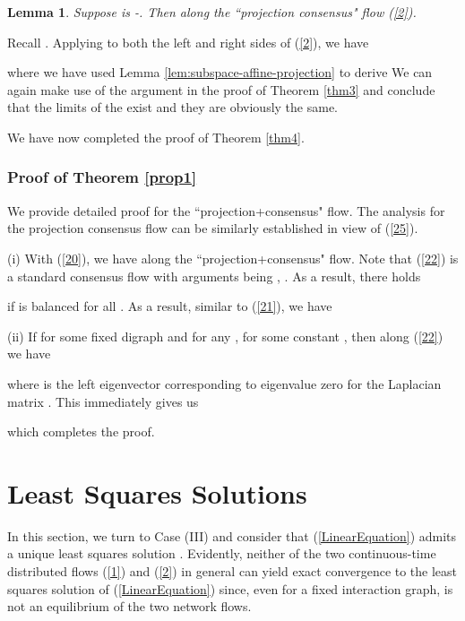 \documentclass[a4paper, 11pt]{article}
\newtheorem{lemma}{Lemma}
\begin{document}
\medskip

\begin{lemma}\label{lemma-bidirectional}
Suppose  is -. Then  along the ``projection consensus" flow (\ref{2}).
\end{lemma}

\medskip






Recall  . Applying  to both the left and right sides of (\ref{2}), we have

where we have used Lemma \ref{lem:subspace-affine-projection} to derive
 We can again make use of the argument  in the proof of Theorem \ref{thm3} and conclude that the limits of the  exist and they are obviously the same.

We have now completed the proof of Theorem \ref{thm4}.

\subsubsection{Proof of Theorem \ref{prop1}}

We provide detailed proof for the ``projection+consensus" flow.  The analysis for the projection consensus flow can be similarly established in view of  (\ref{25}).


\noindent (i) With (\ref{20}), we have 
along the ``projection+consensus" flow. Note that (\ref{22}) is a standard consensus flow with arguments being , . As a result, there holds

if  is balanced for all   \cite{saber04}. As a result, similar to  (\ref{21}), we have


\noindent (ii) If  for some fixed digraph  and for any ,  for some constant , then along (\ref{22}) we have   \cite{saber04}

where  is the left eigenvector corresponding to eigenvalue zero for the Laplacian matrix . This immediately gives us

which completes the proof.
\section{Least Squares Solutions}\label{Sec:least-squares}

In this section, we turn to  Case  (III) and consider that (\ref{LinearEquation}) admits a unique least squares solution . Evidently, neither of the two continuous-time distributed flows (\ref{1}) and (\ref{2}) in general can yield exact convergence to the least squares solution of (\ref{LinearEquation}) since, even for a fixed interaction graph,  is not an equilibrium of the two network flows.
\end{document}
